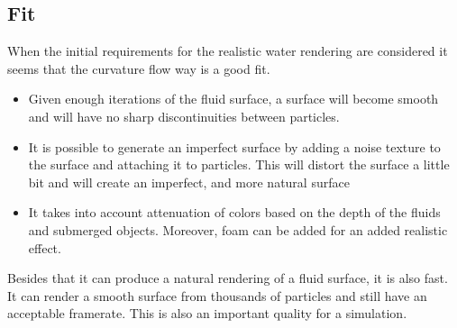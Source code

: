 \subsection{Fit}
When the initial requirements for the realistic water rendering are considered it seems that the curvature flow way is a good fit.
\begin{itemize}
\item Given enough iterations of the fluid surface, a surface will become smooth and will have no sharp discontinuities between particles.
\item It is possible to generate an imperfect surface by adding a noise texture to the surface and attaching it to particles. This will distort the surface a little bit and will create an imperfect, and more natural surface
\item It takes into account attenuation of colors based on the depth of the fluids and submerged objects. Moreover, foam can be added for an added realistic effect.
\end{itemize}
Besides that it can produce a natural rendering of a fluid surface, it is also fast. 
It can render a smooth surface from thousands of particles and still have an acceptable framerate. 
This is also an important quality for a simulation.

